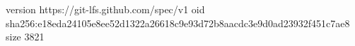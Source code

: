 version https://git-lfs.github.com/spec/v1
oid sha256:e18eda24105e8ee52d1322a26618c9e93d72b8aacdc3e9d0ad23932f451c7ae8
size 3821
